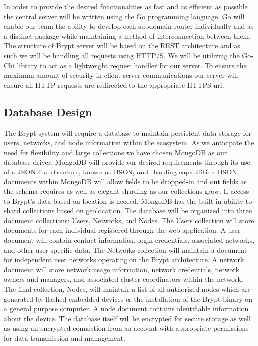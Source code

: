 \documentclass[tikz,a4paper,titlepage]{article}
\begin{document}
In order to provide the desired functionalities as fast and as efficient as possible the central server will be written using the Go programming language. Go will enable our team the ability to develop each subdomain router individually and as a distinct package while maintaining a method of interconnection between them. The structure of Brypt server will be based on the REST architecture and as such we will be handling all requests using HTTP/S. We will be utilizing the Go-Chi library to act as a lightweight request handler for our server. To ensure the maximum amount of security in client-server communications our server will ensure all HTTP requests are redirected to the appropriate HTTPS url.

\subsection{Database Design}

The Brypt system will require a database to maintain persistent data storage for users, networks, and node information within the ecosystem. As we anticipate the need for flexibility and large collections we have chosen MongoDB as our database driver. MongoDB will provide our desired requirements through its use of a JSON like structure, known as BSON, and sharding capabilities. BSON documents within MongoDB will allow fields to be dropped-in and out fields as the schema requires as well as elegant sharding as our collections grow. If access to Brypt’s data based on location is needed, MongoDB has the built-in ability to shard collections based on geolocation. The database will be organized into three document collections: Users, Networks, and Nodes. The Users collection will store documents for each individual registered through the web application. A user document will contain contact information, login credentials, associated networks, and other user-specific data. The Networks collection will maintain a document for independent user networks operating on the Brypt architecture. A network document will store network usage information, network credentials, network owners and managers, and associated cluster coordinators within the network. The final collection, Nodes, will maintain a list of all authorized nodes which are generated by flashed embedded devices or the installation of the Brypt binary on a general purpose computer. A node document contains identifiable information about the device. The database itself will be encrypted for secure storage as well as using an encrypted connection from an account with appropriate permissions for data transmission and management.
\end{document}
